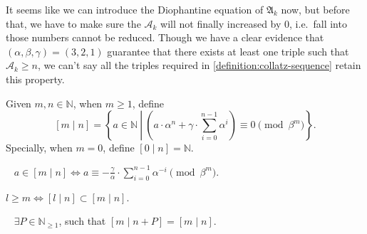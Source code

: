 It seems like we can introduce the Diophantine equation of $\mathfrak{A}_k$ now, but before that, we have to make sure the $\mathcal{A}_k$ will not finally increased by $0$, i.e.\ fall into those numbers cannot be reduced.
Though we have a clear evidence that $(\alpha, \beta, \gamma) = (3, 2, 1)$ guarantee that there exists at least one triple such that $\mathcal{A}_k \ge n$, we can't say all the triples required in \cref{definition:collatz-sequence} retain this property.
\begin{definition}
Given $m,n \in \mathbb{N}$, when $m \ge 1$, define
\[ [m\mid n] = \left\{a \in \mathbb{N}\ \left|\ \left(a\cdot\alpha^n + \gamma\cdot\sum_{i = 0}^{n-1}\alpha^i\right) \equiv 0 \pmod{\beta^{m}}\right.\right\}. \]
Specially, when $m = 0$, define $[0\mid n] = \mathbb{N}$.
\end{definition}
\begin{proposition}~\label{proposition:equivalence-of-classes}
    $a \in [m\mid n] \Longleftrightarrow a\equiv -\frac{\gamma}{\alpha}\cdot\sum_{i=0}^{n-1}\alpha^{-i}\pmod{\beta^{m}}$.
\end{proposition}
\begin{proposition}
    $ l \ge m \Longleftrightarrow [l\mid n] \subset [m\mid n]$.
\end{proposition}
\begin{proposition}~\label{proposition:avaliable-in-finity-step}%
    $\exists P \in \mathbb{N}_{\ge1}$, such that $[m \mid n + P ] = [m\mid n]$.
\end{proposition}
